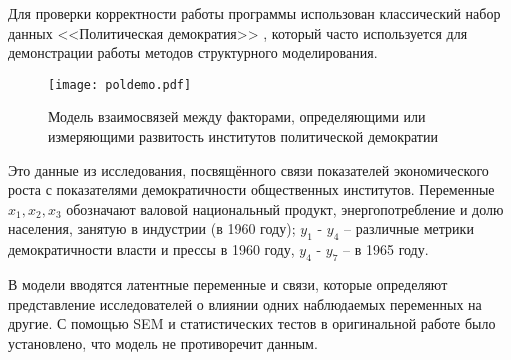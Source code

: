 
Для проверки корректности работы программы использован классический набор данных <<Политическая демократия>> \cite{bollen1979}, который часто используется для демонстрации работы методов структурного моделирования.

\begin{figure}[H]
	\centering \texttt{[image: poldemo.pdf]}
	\caption{ Модель взаимосвязей между факторами, определяющими или измеряющими развитость институтов политической демократии }
	\label{img:poldemo}
\end{figure}

Это данные из исследования, посвящённого связи показателей экономического роста с показателями демократичности общественных институтов.
Переменные $ x_1, x_2, x_3 $ обозначают валовой национальный продукт, энергопотребление и долю населения, занятую в индустрии (в 1960 году); $ y_1 $ - $ y_4 $ -- различные метрики демократичности власти и прессы в 1960 году, $ y_4 $ - $ y_7 $ -- в 1965 году.

В модели вводятся латентные переменные и связи, которые определяют представление исследователей о влиянии одних наблюдаемых переменных на другие.
С помощью SEM и статистических тестов в оригинальной работе \cite{bollen1979} было установлено, что модель не противоречит данным.

